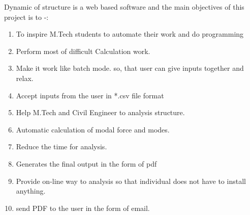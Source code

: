 Dynamic of structure is a web based software and the 
main objectives of this project is to -:
\begin{enumerate}
\item To inspire M.Tech students to automate their work and do programming 
\item Perform most of difficult Calculation work.
\item Make it work like batch mode. so, that user can give inputs 
together and relax.
\item Accept inputs from the user in *.csv file format
\item Help M.Tech and Civil Engineer to analysis structure.
\item Automatic calculation of modal force and modes.
\item Reduce the time for analysis.
\item Generates the final output in the form of pdf
\item Provide on-line way to analysis so that individual does not have to 
install anything.
\item send PDF to the user in the form of email.
\end{enumerate}

